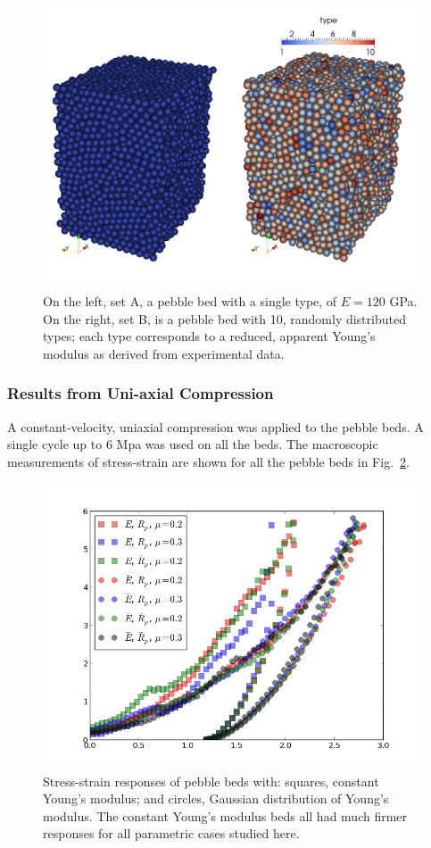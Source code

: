 \begin{figure}[t]
  \centering
  \includegraphics[width = 0.75 \textwidth]{chapters/figures/DEM-types}
  \caption{On the left, set A, a pebble bed with a single type, of $E = 120$ GPa. On the right, set B, is a pebble bed with 10, randomly distributed types; each type corresponds to a reduced, apparent Young's modulus as derived from experimental data.}\label{fig:dem-types}
\end{figure}





\subsubsection{Results from Uni-axial Compression}


A constant-velocity, uniaxial compression was applied to the pebble beds. A single cycle up to 6 Mpa was used on all the beds. The macroscopic measurements of stress-strain are shown for all the pebble beds in Fig.~\ref{fig:stress-strain}.

\begin{figure}[t]
  \centering
  \includegraphics[width = 0.75 \textwidth]{chapters/figures/stress-strain}
  \caption{Stress-strain responses of pebble beds with: squares, constant Young's modulus; and circles, Gaussian distribution of Young's modulus. The constant Young's modulus beds all had much firmer responses for all parametric cases studied here.}\label{fig:stress-strain}
\end{figure}


